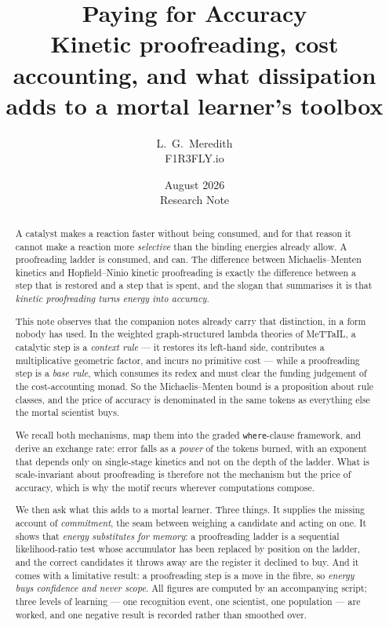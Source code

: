\documentclass[11pt]{article}
\title{Paying for Accuracy\\
\large Kinetic proofreading, cost accounting, and what dissipation adds to a
mortal learner's toolbox}
\author{L.~G.~Meredith\\ \small F1R3FLY.io}
\date{August 2026\\[2pt]\small Research Note}
\theoremstyle{plain}
\theoremstyle{definition}
\theoremstyle{remark}
\begin{document}
\maketitle

\begin{abstract}
\noindent
A catalyst makes a reaction faster without being consumed, and for that
reason it cannot make a reaction more \emph{selective} than the binding
energies already allow. A proofreading ladder is consumed, and can. The
difference between Michaelis--Menten kinetics and Hopfield--Ninio kinetic
proofreading is exactly the difference between a step that is restored and a
step that is spent, and the slogan that summarises it is that \emph{kinetic
proofreading turns energy into accuracy}.

This note observes that the companion notes already carry that distinction,
in a form nobody has used. In the weighted graph-structured lambda theories
of MeTTaIL, a catalytic step is a \emph{context rule} --- it restores its
left-hand side, contributes a multiplicative geometric factor, and incurs no
primitive cost --- while a proofreading step is a \emph{base rule}, which
consumes its redex and must clear the funding judgement of the cost-accounting
monad. So the Michaelis--Menten bound is a proposition about rule classes, and
the price of accuracy is denominated in the same tokens as everything else the
mortal scientist buys.

We recall both mechanisms, map them into the graded \texttt{where}-clause
framework, and derive an exchange rate: error falls as a \emph{power} of the
tokens burned, with an exponent that depends only on single-stage kinetics and
not on the depth of the ladder. What is scale-invariant about proofreading is
therefore not the mechanism but the price of accuracy, which is why the motif
recurs wherever computations compose.

We then ask what this adds to a mortal learner. Three things. It supplies the
missing account of \emph{commitment}, the seam between weighing a candidate
and acting on one. It shows that \emph{energy substitutes for memory}: a
proofreading ladder is a sequential likelihood-ratio test whose accumulator
has been replaced by position on the ladder, and the correct candidates it
throws away are the register it declined to buy. And it comes with a
limitative result: a proofreading step is a move in the fibre, so
\emph{energy buys confidence and never scope}. All figures are computed by an
accompanying script; three levels of learning --- one recognition event, one
scientist, one population --- are worked, and one negative result is recorded
rather than smoothed over.
\end{abstract}
\end{document}
